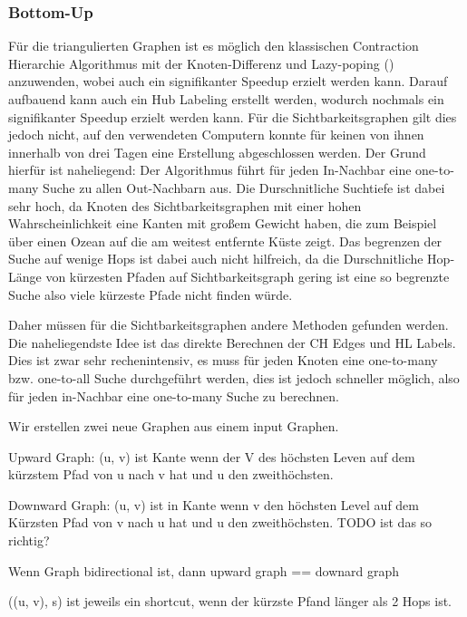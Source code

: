\subsubsection{Bottom-Up}


\clearpage

Für die triangulierten Graphen ist es möglich den klassischen Contraction Hierarchie Algorithmus mit der Knoten-Differenz und Lazy-poping (\cite{geisberger2008contraction}) anzuwenden, wobei auch ein signifikanter Speedup erzielt werden kann. 
Darauf aufbauend kann auch ein Hub Labeling erstellt werden, wodurch nochmals ein signifikanter Speedup erzielt werden kann.
Für die Sichtbarkeitsgraphen gilt dies jedoch nicht, auf den verwendeten Computern konnte für keinen von ihnen innerhalb von drei Tagen eine Erstellung abgeschlossen werden.
Der Grund hierfür ist naheliegend: Der Algorithmus führt für jeden In-Nachbar eine one-to-many Suche zu allen Out-Nachbarn aus.
Die Durschnitliche Suchtiefe ist dabei sehr hoch, da Knoten des Sichtbarkeitsgraphen mit einer hohen Wahrscheinlichkeit eine Kanten mit großem Gewicht haben, die zum Beispiel über einen Ozean auf die am weitest entfernte Küste zeigt.
Das begrenzen der Suche auf wenige Hops ist dabei auch nicht hilfreich, da die Durschnitliche Hop-Länge von kürzesten Pfaden auf Sichtbarkeitsgraph gering ist eine so begrenzte Suche also viele kürzeste Pfade nicht finden würde.

Daher müssen für die Sichtbarkeitsgraphen andere Methoden gefunden werden.
Die naheliegendste Idee ist das direkte Berechnen der CH Edges und HL Labels.
Dies ist zwar sehr rechenintensiv, es muss für jeden Knoten eine one-to-many bzw. one-to-all Suche durchgeführt werden, dies ist jedoch schneller möglich, also für jeden in-Nachbar eine one-to-many Suche zu berechnen.



Wir erstellen zwei neue Graphen aus einem input Graphen.

Upward Graph: (u, v) ist Kante wenn der V des höchsten Leven auf dem kürzstem Pfad von u nach v hat und u den zweithöchsten.

Downward Graph: (u, v) ist in Kante wenn v den höchsten Level auf dem Kürzsten Pfad von v nach u hat und u den zweithöchsten.
TODO ist das so richtig?

Wenn Graph bidirectional ist, dann upward graph == downard graph

((u, v), s) ist jeweils ein shortcut, wenn der kürzste Pfand länger als 2 Hops ist.

